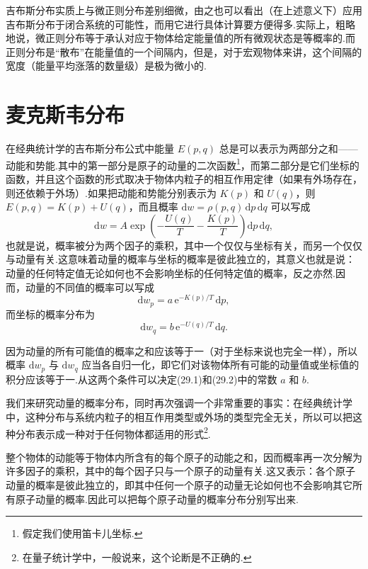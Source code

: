吉布斯分布实质上与微正则分布差别细微，由之也可以看出（在上述意义下）应用吉布斯分布于闭合系统的可能性，而用它进行具体计算要方便得多.实际上，粗略地说，微正则分布等于承认对应于物体给定能量值的所有微观状态是等概率的.而正则分布是“散布”在能量值的一个间隔内，但是，对于宏观物体来讲，这个间隔的宽度（能量平均涨落的数量级）是极为微小的.

\section{麦克斯韦分布}

在经典统计学的吉布斯分布公式中能量 $E(p,q)$ 总是可以表示为两部分之和——动能和势能.其中的第一部分是原子的动量的二次函数\footnote{假定我们使用笛卡儿坐标.}，而第二部分是它们坐标的函数，并且这个函数的形式取决于物体内粒子的相互作用定律（如果有外场存在，则还依赖于外场）.如果把动能和势能分别表示为 $K(p)$ 和 $U(q)$，则 $E(p,q)=K(p)+U(q)$，而且概率 $\mathrm{d}w=\rho(p,q)\,\mathrm{d}p\,\mathrm{d}q$ 可以写成
\begin{equation*}
  \mathrm{d}w=A\exp\left(-\frac{U(q)}{T}-\frac{K(p)}{T}\right)\mathrm{d}p\,\mathrm{d}q,
\end{equation*}
也就是说，概率被分为两个因子的乘积，其中一个仅仅与坐标有关，而另一个仅仅与动量有关.这意味着动量的概率与坐标的概率是彼此独立的，其意义也就是说：动量的任何特定值无论如何也不会影响坐标的任何特定值的概率，反之亦然.因而，动量的不同值的概率可以写成
\begin{equation}
  \mathrm{d}w_p=a\,\mathrm{e}^{-K(p)/T}\,\mathrm{d}p,
\end{equation}
而坐标的概率分布为
\begin{equation}
  \mathrm{d}w_q=b\,\mathrm{e}^{-U(q)/T}\,\mathrm{d}q.
\end{equation}

因为动量的所有可能值的概率之和应该等于一（对于坐标来说也完全一样），所以概率 $\mathrm{d}w_p$ 与 $\mathrm{d}w_q$ 应当各自归一化，即它们对该物体所有可能的动量值或坐标值的积分应该等于一.从这两个条件可以决定(29.1)和(29.2)中的常数 $a$ 和 $b$.

我们来研究动量的概率分布，同时再次强调一个非常重要的事实：在经典统计学中，这种分布与系统内粒子的相互作用类型或外场的类型完全无关，所以可以把这种分布表示成一种对于任何物体都适用的形式\footnote{在量子统计学中，一般说来，这个论断是不正确的.}.

整个物体的动能等于物体内所含有的每个原子的动能之和，因而概率再一次分解为许多因子的乘积，其中的每个因子只与一个原子的动量有关.这又表示：各个原子动量的概率是彼此独立的，即其中任何一个原子的动量无论如何也不会影响其它所有原子动量的概率.因此可以把每个原子动量的概率分布分别写出来.

